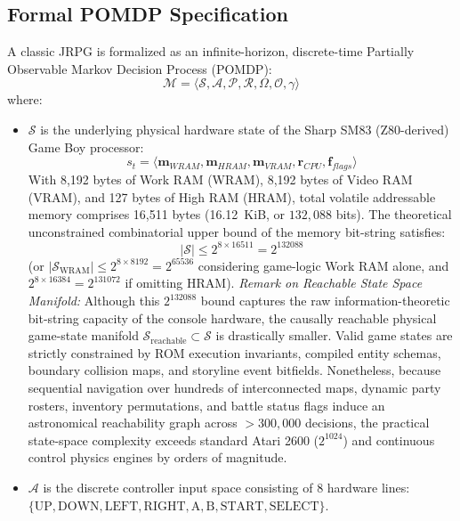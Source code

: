 \documentclass[journal,10pt,twocolumn]{IEEEtran}
\begin{document}
\subsection{Formal POMDP Specification}
A classic JRPG is formalized as an infinite-horizon, discrete-time Partially Observable Markov Decision Process (POMDP):
\begin{equation}
\mathcal{M} = \langle \mathcal{S}, \mathcal{A}, \mathcal{P}, \mathcal{R}, \Omega, \mathcal{O}, \gamma \rangle
\end{equation}
where:
\begin{itemize}
    \item $\mathcal{S}$ is the underlying physical hardware state of the Sharp SM83 (Z80-derived) Game Boy processor:
    \begin{equation}
    s_t = \langle \mathbf{m}_{WRAM}, \mathbf{m}_{HRAM}, \mathbf{m}_{VRAM}, \mathbf{r}_{CPU}, \mathbf{f}_{flags} \rangle
    \end{equation}
    With 8,192 bytes of Work RAM (WRAM), 8,192 bytes of Video RAM (VRAM), and 127 bytes of High RAM (HRAM), total volatile addressable memory comprises 16,511 bytes (16.12~KiB, or $132{,}088$ bits). The theoretical unconstrained combinatorial upper bound of the memory bit-string satisfies:
    \begin{equation}
    |\mathcal{S}| \le 2^{8 \times 16511} = 2^{132088}
    \end{equation}
    (or $|\mathcal{S}_{\text{WRAM}}| \le 2^{8 \times 8192} = 2^{65536}$ considering game-logic Work RAM alone, and $2^{8 \times 16384} = 2^{131072}$ if omitting HRAM).
    \textit{Remark on Reachable State Space Manifold:} Although this $2^{132088}$ bound captures the raw information-theoretic bit-string capacity of the console hardware, the causally reachable physical game-state manifold $\mathcal{S}_{\text{reachable}} \subset \mathcal{S}$ is drastically smaller. Valid game states are strictly constrained by ROM execution invariants, compiled entity schemas, boundary collision maps, and storyline event bitfields. Nonetheless, because sequential navigation over hundreds of interconnected maps, dynamic party rosters, inventory permutations, and battle status flags induce an astronomical reachability graph across $>300{,}000$ decisions, the practical state-space complexity exceeds standard Atari 2600 ($2^{1024}$) and continuous control physics engines by orders of magnitude.
    \item $\mathcal{A}$ is the discrete controller input space consisting of 8 hardware lines: $\{\text{UP}, \text{DOWN}, \text{LEFT}, \text{RIGHT}, \text{A}, \text{B}, \text{START}, \text{SELECT}\}$.

\end{itemize}
\end{document}

